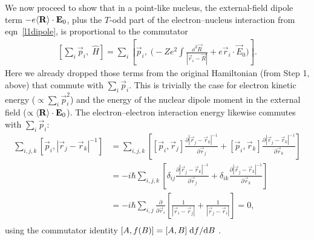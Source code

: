 We now proceed to show that in a point-like nucleus, the external-field dipole
term $-e\langle \mathbf{R}\rangle\cdot\mathbf{E}_0$, plus the $T$-odd part of the
electron--nucleus interaction from eqn~\ref{l1dipole}, is proportional to the
commutator
%
\begin{align}
    \label{comm7}
    \left[\textstyle\sum_i\vec p_i,\;\hat H\right]
    =\sum_i\left[\vec p_i,\;\big(
    -Ze^2\int\frac{\dd^3\vec R}{|\vec r_i-\vec R|}
    +e\vec r_i\cdot\vec E_0
    \big)\right].
\end{align}
%
Here we already dropped those terms from the original Hamiltonian (from Step 1,
above) that commute with $\sum_i\vec p_i$. This is trivially the case for
electron kinetic energy ($\propto\sum_i\vec p_i^2$) and the energy of the
nuclear dipole moment in the external field ($\propto\langle \mathbf{R}\rangle\cdot\mathbf{E}_0$).
The electron--electron interaction energy likewise commutes with $\sum_i\vec
p_i$:
%
\begin{align*}
    \sum_{i,j,k}\left[\vec p_i,|\vec r_j-\vec r_k|^{-1}\right]
    &=
    \sum_{i,j,k}\left[
        [\vec p_i,\vec r_j]\frac{\partial|\vec r_j-\vec r_k|^{-1}}{\partial\vec r_j}
        +
        [\vec p_i,\vec r_k]\frac{\partial|\vec r_j-\vec r_k|^{-1}}{\partial\vec r_k}
    \right]\\
    &=-i\hbar
    \sum_{i,j,k}\left[
        \delta_{ij}\frac{\partial|\vec r_j-\vec r_k|^{-1}}{\partial\vec r_j}
        +
        \delta_{ik}\frac{\partial|\vec r_j-\vec r_k|^{-1}}{\partial\vec r_k}
    \right]\\
    &=-i\hbar
    \sum_{i,j}
    \frac{\partial}{\partial\vec r_i}
    \left[
        \frac1{|\vec r_i-\vec r_j|}
        +
        \frac1{|\vec r_j-\vec r_i|}
    \right]=0,\\
\end{align*}
%
using the commutator identity $[A,f(B)]=[A,B]\;\mathrm{d} f/\mathrm{d} B$
\cite[eqn~2.25]{binney2013physics}.

